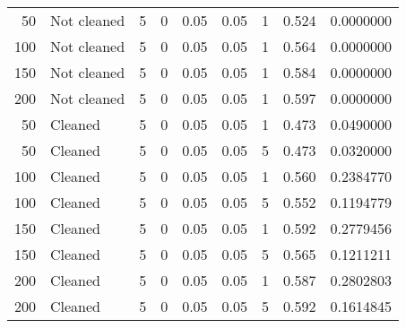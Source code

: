 \begin{table}
{{\begin{tabular}{rlrrrrrrr}
\hspace{1em}50 & Not cleaned & 5 & 0 & 0.05 & 0.05 & 1 & 0.524 & 0.0000000\\
\hspace{1em}100 & Not cleaned & 5 & 0 & 0.05 & 0.05 & 1 & 0.564 & 0.0000000\\
\hspace{1em}150 & Not cleaned & 5 & 0 & 0.05 & 0.05 & 1 & 0.584 & 0.0000000\\
\hspace{1em}200 & Not cleaned & 5 & 0 & 0.05 & 0.05 & 1 & 0.597 & 0.0000000\\
\hspace{1em}50 & Cleaned & 5 & 0 & 0.05 & 0.05 & 1 & 0.473 & 0.0490000\\
\hspace{1em}50 & Cleaned & 5 & 0 & 0.05 & 0.05 & 5 & 0.473 & 0.0320000\\
\hspace{1em}100 & Cleaned & 5 & 0 & 0.05 & 0.05 & 1 & 0.560 & 0.2384770\\
\hspace{1em}100 & Cleaned & 5 & 0 & 0.05 & 0.05 & 5 & 0.552 & 0.1194779\\
\hspace{1em}150 & Cleaned & 5 & 0 & 0.05 & 0.05 & 1 & 0.592 & 0.2779456\\
\hspace{1em}150 & Cleaned & 5 & 0 & 0.05 & 0.05 & 5 & 0.565 & 0.1211211\\
\hspace{1em}200 & Cleaned & 5 & 0 & 0.05 & 0.05 & 1 & 0.587 & 0.2802803\\
\hspace{1em}200 & Cleaned & 5 & 0 & 0.05 & 0.05 & 5 & 0.592 & 0.1614845\\
\bottomrule
\end{tabular}
}}
 \end{table}